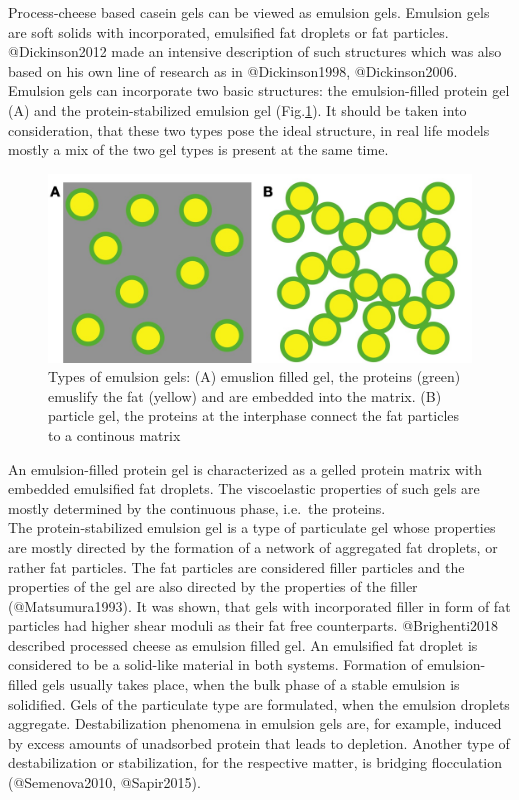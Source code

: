 \documentclass[
]{article}
\begin{document}
Process-cheese based casein gels can be viewed as emulsion gels.
Emulsion gels are soft solids with incorporated, emulsified fat droplets
or fat particles. @Dickinson2012 made an intensive description of such
structures which was also based on his own line of research as in
@Dickinson1998, @Dickinson2006. Emulsion gels can incorporate two basic
structures: the emulsion-filled protein gel (A) and the
protein-stabilized emulsion gel (Fig.\ref{fig:efg}). It should be taken
into consideration, that these two types pose the ideal structure, in
real life models mostly a mix of the two gel types is present at the
same time.

\begin{figure}
\includegraphics[width=0.5\linewidth]{images/EFG} \caption[Types of emulsion gels]{Types of emulsion gels: (A) emuslion filled gel, the proteins (green) emuslify the fat (yellow) and are embedded into the matrix. (B) particle gel, the proteins at the interphase connect the fat particles to a continous matrix}\label{fig:efg}
\end{figure}

An emulsion-filled protein gel is characterized as a gelled protein
matrix with embedded emulsified fat droplets. The viscoelastic
properties of such gels are mostly determined by the continuous phase,
i.e.~the proteins.\\
The protein-stabilized emulsion gel is a type of particulate gel whose
properties are mostly directed by the formation of a network of
aggregated fat droplets, or rather fat particles. The fat particles are
considered filler particles and the properties of the gel are also
directed by the properties of the filler (@Matsumura1993). It was shown,
that gels with incorporated filler in form of fat particles had higher
shear moduli as their fat free counterparts. @Brighenti2018 described
processed cheese as emulsion filled gel. An emulsified fat droplet is
considered to be a solid-like material in both systems. Formation of
emulsion-filled gels usually takes place, when the bulk phase of a
stable emulsion is solidified. Gels of the particulate type are
formulated, when the emulsion droplets aggregate. Destabilization
phenomena in emulsion gels are, for example, induced by excess amounts
of unadsorbed protein that leads to depletion. Another type of
destabilization or stabilization, for the respective matter, is bridging
flocculation (@Semenova2010, @Sapir2015).
\end{document}
